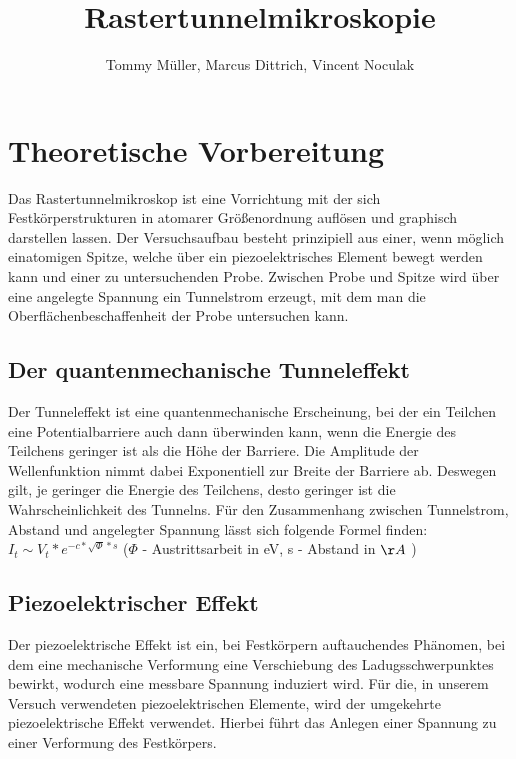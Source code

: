 \documentclass[10pt,a4paper]{article}
\author{Tommy Müller, Marcus Dittrich, Vincent Noculak}
\title{Rastertunnelmikroskopie}
\begin{document}
\maketitle
\newpage
\tableofcontents
\newpage

\section{ Theoretische Vorbereitung}

Das Rastertunnelmikroskop ist eine Vorrichtung mit der sich Festkörperstrukturen in atomarer Größenordnung auflösen und graphisch darstellen lassen. Der Versuchsaufbau besteht prinzipiell aus einer, wenn möglich einatomigen Spitze, welche über ein piezoelektrisches Element bewegt werden kann und einer zu untersuchenden Probe. Zwischen Probe und Spitze wird über eine angelegte Spannung ein Tunnelstrom erzeugt, mit dem man die Oberflächenbeschaffenheit der Probe untersuchen kann.

\subsection{ Der quantenmechanische Tunneleffekt}

Der Tunneleffekt ist eine quantenmechanische Erscheinung, bei der ein Teilchen eine Potentialbarriere auch dann überwinden kann, wenn die Energie des Teilchens geringer ist als die Höhe der Barriere. Die Amplitude der Wellenfunktion nimmt dabei Exponentiell zur Breite der Barriere ab. Deswegen gilt, je geringer die Energie des Teilchens, desto geringer ist die Wahrscheinlichkeit des Tunnelns. Für den Zusammenhang zwischen Tunnelstrom, Abstand und angelegter Spannung lässt sich folgende Formel finden:
$I_{t} \sim V_{t} * e^{-c*\sqrt{\Phi }*s}$ ($\Phi$ - Austrittsarbeit in eV, s - Abstand in $\AA$  )

\subsection{	Piezoelektrischer Effekt}

Der piezoelektrische Effekt ist ein, bei Festkörpern auftauchendes Phänomen, bei dem eine mechanische Verformung eine Verschiebung des Ladugsschwerpunktes bewirkt, wodurch eine messbare Spannung induziert wird. Für die, in unserem Versuch verwendeten piezoelektrischen Elemente, wird der umgekehrte piezoelektrische Effekt verwendet. Hierbei führt das Anlegen einer Spannung zu einer Verformung des Festkörpers.
\end{document}
